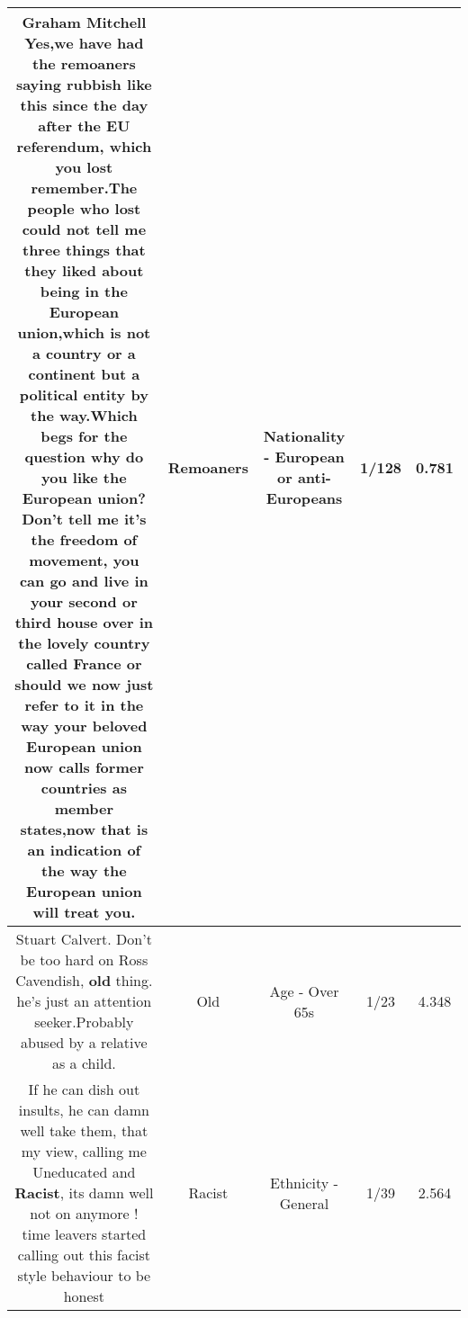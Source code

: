 \documentclass[11pt]{article}
\newlength\mylength
\begin{document}
\begin{center}
\begin{longtable}{|C{.65\mylength}|C{.30\mylength}|C{.12\mylength}|C{.12\mylength}|C{.12\mylength}|}
  \small Graham Mitchell Yes,we have had the \textbf{remoaners} saying rubbish like this since the day after the EU referendum, which you lost remember.The people who lost could not tell me three things that they liked about being in the European union,which is not a country or a continent but a political entity by the way.Which begs for the question why do you like the European union?Don't tell me it's the freedom of movement, you can go and live in your second or third house over in the lovely country called France or should we now just refer to it in the way your beloved European union now calls former countries as member states,now that is an indication of the way the European union will treat you.\normalsize   & Remoaners & Nationality - European or anti-Europeans & 1/128 & 0.781 \\  \hline
  \small Stuart Calvert. Don't be too hard on Ross Cavendish, \textbf{old} thing. he's just an attention seeker.Probably abused by a relative as a child.\normalsize   & Old & Age - Over 65s & 1/23 & 4.348 \\  \hline
  \small If he can dish out insults, he can damn well take them, that my view, calling me Uneducated and \textbf{Racist}, its damn well not on anymore ! time leavers started calling out this facist style behaviour to be honest\normalsize   & Racist & Ethnicity - General & 1/39 & 2.564 \\  \hline

\end{longtable}
\end{center}
\end{document}
